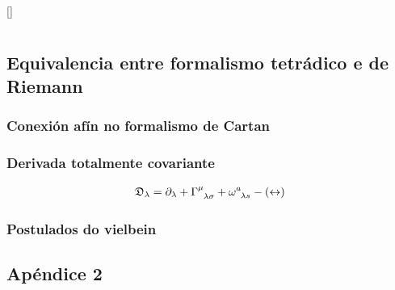 \renewcommand{\thesection}{Anexos}
\titleformat{\section}[block]{\normalfont\Large\bfseries}{}{0.1em}{\thesection}[]
\renewcommand{\thesubsection}{\Alph{subsection}}
\setcounter{equation}{0} %
\renewcommand{\theequation}{\Alph{subsection}.\arabic{equation}}
\setcounter{table}{0} %
\renewcommand{\thetable}{\Alph{subsection}.\arabic{table}}
\setcounter{figure}{0} %
\renewcommand{\thefigure}{\Alph{subsection}.\arabic{figure}}

\section{}

\subsection{Equivalencia entre formalismo tetrádico e de Riemann}
\subsubsection{Conexión afín no formalismo de Cartan}
\subsubsection{Derivada totalmente covariante}
\begin{align}
    \mathfrak{D}_\lambda = \partial_\lambda +\Gamma\indices{^\mu_\lambda_\sigma} + \omega\indices{^a_\lambda_s} - (\leftrightarrow)
\end{align}

\subsubsection{Postulados do vielbein}



\setcounter{equation}{0} %
\renewcommand{\theequation}{\Alph{subsection}.\arabic{equation}}
\setcounter{table}{0} %
\renewcommand{\thetable}{\Alph{subsection}.\arabic{table}}
\setcounter{figure}{0} %
\renewcommand{\thefigure}{\Alph{subsection}.\arabic{figure}}
\subsection{Apéndice 2}




